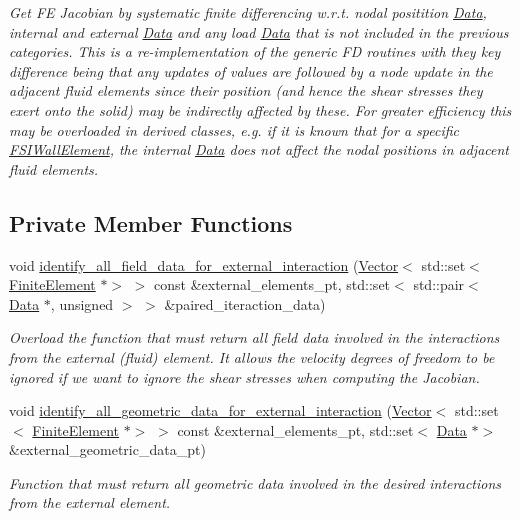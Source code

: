 \begin{DoxyCompactItemize}
\begin{DoxyCompactList}\small\item\em Get FE Jacobian by systematic finite differencing w.\+r.\+t. nodal positition \hyperlink{classoomph_1_1Data}{Data}, internal and external \hyperlink{classoomph_1_1Data}{Data} and any load \hyperlink{classoomph_1_1Data}{Data} that is not included in the previous categories. This is a re-\/implementation of the generic FD routines with they key difference being that any updates of values are followed by a node update in the adjacent fluid elements since their position (and hence the shear stresses they exert onto the solid) may be indirectly affected by these. For greater efficiency this may be overloaded in derived classes, e.\+g. if it is known that for a specific \hyperlink{classoomph_1_1FSIWallElement}{F\+S\+I\+Wall\+Element}, the internal \hyperlink{classoomph_1_1Data}{Data} does not affect the nodal positions in adjacent fluid elements. \end{DoxyCompactList}\end{DoxyCompactItemize}
\subsection*{Private Member Functions}
\begin{DoxyCompactItemize}
\item 
void \hyperlink{classoomph_1_1FSIWallElement_a7a9552507bd4193dc3121a60453ed392}{identify\+\_\+all\+\_\+field\+\_\+data\+\_\+for\+\_\+external\+\_\+interaction} (\hyperlink{classoomph_1_1Vector}{Vector}$<$ std\+::set$<$ \hyperlink{classoomph_1_1FiniteElement}{Finite\+Element} $\ast$$>$ $>$ const \&external\+\_\+elements\+\_\+pt, std\+::set$<$ std\+::pair$<$ \hyperlink{classoomph_1_1Data}{Data} $\ast$, unsigned $>$ $>$ \&paired\+\_\+iteraction\+\_\+data)
\begin{DoxyCompactList}\small\item\em Overload the function that must return all field data involved in the interactions from the external (fluid) element. It allows the velocity degrees of freedom to be ignored if we want to ignore the shear stresses when computing the Jacobian. \end{DoxyCompactList}\item 
void \hyperlink{classoomph_1_1FSIWallElement_ab8c98231f65ff11da582bf58ab1910fe}{identify\+\_\+all\+\_\+geometric\+\_\+data\+\_\+for\+\_\+external\+\_\+interaction} (\hyperlink{classoomph_1_1Vector}{Vector}$<$ std\+::set$<$ \hyperlink{classoomph_1_1FiniteElement}{Finite\+Element} $\ast$$>$ $>$ const \&external\+\_\+elements\+\_\+pt, std\+::set$<$ \hyperlink{classoomph_1_1Data}{Data} $\ast$$>$ \&external\+\_\+geometric\+\_\+data\+\_\+pt)
\begin{DoxyCompactList}\small\item\em Function that must return all geometric data involved in the desired interactions from the external element. \end{DoxyCompactList}\end{DoxyCompactItemize}
